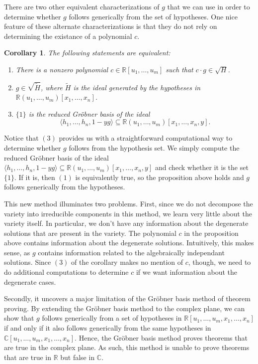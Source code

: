 \documentclass[12pt]{article}
\theoremstyle{plain}
\newtheorem{Corollary}[Theorem]{Corollary}
\theoremstyle{definition}
\theoremstyle{remark}
\newcommand{\gro}{Gr\"obner }
\begin{document}
There are two other equivalent characterizations of $g$ that we can use in order to determine whether $g$ follows generically from the set of hypotheses.
One nice feature of these alternate characterizations is that they do not rely on determining the existance of a polynomial $c$.
\begin{Corollary}
    The following statements are equivalent:
    \begin{enumerate}
        \item There is a nonzero polynomial $c \in \mathbb{R}[u_1,\dots,u_m]$ such that $c \cdot g \in \sqrt{H}$.
        \item $g \in \sqrt{\tilde{H}}$, where $\tilde{H}$ is the ideal generated by the hypotheses in $\mathbb{R}(u_1,\dots,u_m)[x_1,\dots,x_n]$.
        \item $\{1\}$ is the reduced \gro basis of the ideal $$\langle h_1, \dots, h_n, 1-yg \rangle \subseteq \mathbb{R}(u_1,\dots,u_m)[x_1,\dots,x_n,y].$$
    \end{enumerate}
\end{Corollary}

Notice that $(3)$ provides us with a straightforward computational way to determine whether $g$ follows from the hypothesis set.
We simply compute the reduced \gro basis of the ideal $\langle h_1, \dots, h_n, 1-yg \rangle \subseteq \mathbb{R}(u_1,\dots,u_m)[x_1,\dots,x_n,y]$ and check whether it is the set $\{1\}$.
If it is, then $(1)$ is equivalently true, so the proposition above holds and $g$ follows generically from the hypotheses.

This new method illuminates two problems. First, since we do not decompose the variety into irreducible components in this method, we learn very little about the variety itself.
In particular, we don't have any information about the degenerate solutions that are present in the variety. 
The polynomial $c$ in the proposition above contains information about the degenerate solutions. 
Intuitively, this makes sense, as $g$ contains information related to the algebraically independant solutions. 
Since $(3)$ of the corollary makes no mention of $c$, though, we need to do additional computations to determine $c$ if we want information about the degenerate cases.

Secondly, it uncovers a major limitation of the \gro basis method of theorem proving. 
By extending the \gro basis method to the complex plane, we can show that $g$ follows generically from a set of hypotheses in $\mathbb{R}[u_1,\dots,u_m,x_1,\dots,x_n]$ if and only if it also follows 
generically from the same hypotheses in $\mathbb{C}[u_1,\dots,u_m,x_1,\dots,x_n]$.
Hence, the \gro basis method proves theorems that are true in the complex plane. As such, this method is unable to prove theorems that are true in $\mathbb{R}$ but false in $\mathbb{C}$.
\end{document}
